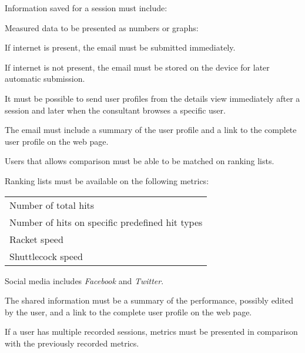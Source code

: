 Information saved for a session must include: \newline
{}


Measured data to be presented as numbers or graphs: \newline
{}


If internet is present, the email must be submitted immediately.

If internet is not present, the email must be stored on the device for later automatic submission.

It must be possible to send user profiles from the details view immediately after a session and later when the consultant browses a specific user.

The email must include a summary of the user profile and a link to the complete user profile on the web page.


Users that allows comparison must be able to be matched on ranking lists.

Ranking lists must be available on the following metrics: \newline
\begin{tabularx}{\textwidth}{X}
    Number of total hits \\
    Number of hits on specific predefined hit types \\
    Racket speed \\
    Shuttlecock speed \\
\end{tabularx}


Social media includes \textit{Facebook} and \textit{Twitter}.

The shared information must be a summary of the performance, possibly edited by the user, and a link to the complete user profile on the web page.


If a user has multiple recorded sessions, metrics must be presented in comparison with the previously recorded metrics.
